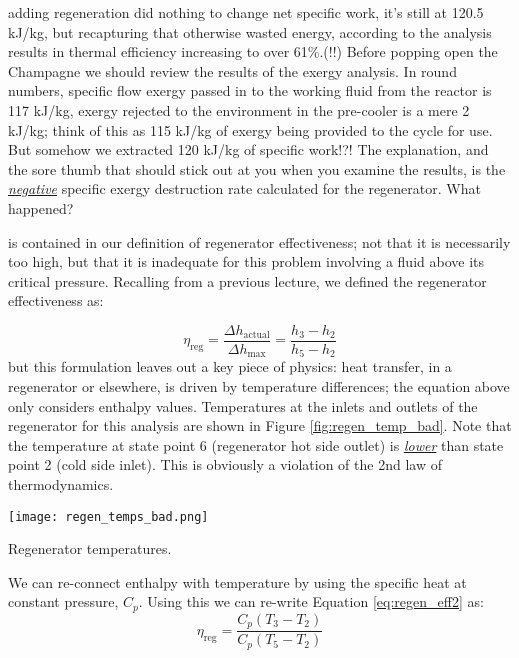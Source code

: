  adding regeneration did nothing to change net specific work, it's still at 120.5 kJ/kg, but recapturing that otherwise wasted energy, according to the analysis results in thermal efficiency increasing to over 61\%.(!!)  Before popping open the Champagne we should review the results of the exergy analysis. In round numbers, specific flow exergy passed in to the working fluid from the reactor is 117 kJ/kg, exergy rejected to the environment in the pre-cooler is a mere 2 kJ/kg; think of this as 115 kJ/kg of exergy being provided to the cycle for use.  But somehow we extracted 120 kJ/kg of specific work!?!  The explanation, and the sore thumb that should stick out at you when you examine the results, is the \underline{\emph{negative}} specific exergy destruction rate calculated for the regenerator.  What happened?

 is contained in our definition of regenerator effectiveness; not that it is necessarily too high, but that it is inadequate for this problem involving a fluid above its critical pressure.  Recalling from a previous lecture, we defined the regenerator effectiveness as:

\begin{equation}
\eta_{\text{reg}} = \frac{\Delta h_{\text{actual}}}{\Delta h_{\text{max}}} = \frac{h_3 - h_2}{h_5 - h_2}
\label{eq:regen_eff2}
\end{equation}   
but this formulation leaves out a key piece of physics: heat transfer, in a regenerator or elsewhere, is driven by temperature differences; the equation above only considers enthalpy values. Temperatures at the inlets and outlets of the regenerator for this analysis are shown in Figure \ref{fig:regen_temp_bad}. Note that the temperature at state point 6 (regenerator hot side outlet) is \underline{\emph{lower}} than state point 2 (cold side inlet).  This is obviously a violation of the 2nd law of thermodynamics.
\begin{marginfigure}
\texttt{[image: regen\_temps\_bad.png]}
\caption{Regenerator temperatures.}
\label{fig:regen_temp_bad}
\end{marginfigure}
We can re-connect enthalpy with temperature by using the specific heat at constant pressure, $C_p$.  Using this we can re-write Equation \ref{eq:regen_eff2} as:
\begin{equation}
\eta_{\text{reg}}=\frac{C_p(T_3 - T_2)}{C_p(T_5 - T_2)}
\label{eq:regen_eff3} 
\end{equation}

